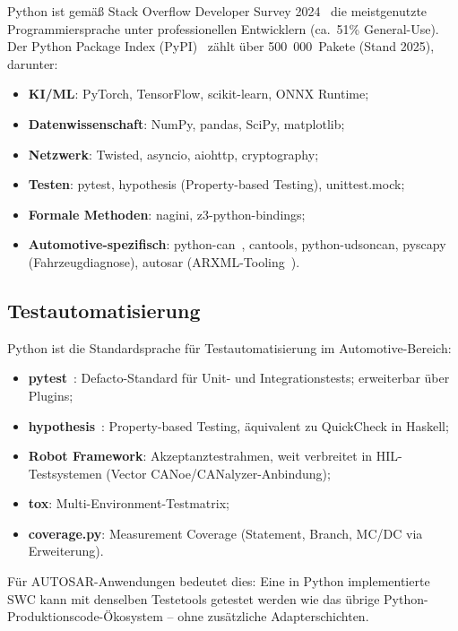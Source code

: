 ﻿\documentclass[12pt,a4paper,twoside]{article}
\begin{document}
Python ist gemäß Stack Overflow Developer Survey 2024~\cite{stackoverflow_survey2024}
die meistgenutzte Programmiersprache unter professionellen
Entwicklern (ca.\ 51\% General-Use).
Der Python Package Index (PyPI)~\cite{pypi_stats2024} zählt über
500~000~Pakete (Stand 2025), darunter:

\begin{itemize}
  \item \textbf{KI/ML}: PyTorch, TensorFlow, scikit-learn, ONNX Runtime;
  \item \textbf{Datenwissenschaft}: NumPy, pandas, SciPy, matplotlib;
  \item \textbf{Netzwerk}: Twisted, asyncio, aiohttp, cryptography;
  \item \textbf{Testen}: pytest, hypothesis (Property-based Testing), unittest.mock;
  \item \textbf{Formale Methoden}: nagini, z3-python-bindings;
  \item \textbf{Automotive-spezifisch}: python-can~\cite{python_can2023},
        cantools, python-udsoncan, pyscapy (Fahrzeugdiagnose),
        autosar (ARXML-Tooling~\cite{pyautosar_gh}).
\end{itemize}

\subsection{Testautomatisierung}
\label{subsec:testing}

Python ist die Standardsprache für Testautomatisierung im Automotive-Bereich:

\begin{itemize}
  \item \textbf{pytest}~\cite{pytest2023}: Defacto-Standard für Unit- und
        Integrationstests; erweiterbar über Plugins;
  \item \textbf{hypothesis}~\cite{hypothesis2019}: Property-based Testing,
        äquivalent zu QuickCheck in Haskell;
  \item \textbf{Robot Framework}: Akzeptanztestrahmen, weit verbreitet in
        HIL-Testsystemen (Vector CANoe/CANalyzer-Anbindung);
  \item \textbf{tox}: Multi-Environment-Testmatrix;
  \item \textbf{coverage.py}: Measurement Coverage (Statement, Branch, MC/DC via
        Erweiterung).
\end{itemize}

Für AUTOSAR-Anwendungen bedeutet dies: Eine in Python implementierte
SWC kann mit denselben Testetools getestet werden wie das übrige
Python-Produktionscode-Ökosystem -- ohne zusätzliche Adapterschichten.
\end{document}
